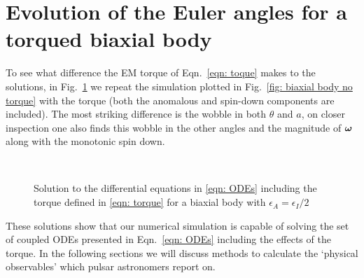 \documentclass[../full_thesis/full_thesis.tex]{subfiles}
\begin{document}
\section{Evolution of the Euler angles for a torqued biaxial body}
To see what difference the EM torque of Eqn.~\eqref{eqn: toque}  makes to the
solutions, in Fig.~\ref{fig: biaxial body with torque} we repeat the simulation
plotted in Fig.~\ref{fig: biaxial body no torque} with the torque (both the
anomalous and spin-down components are included). The most
striking difference is the wobble in both $\theta$ and $a$, on closer
inspection one also finds this wobble in the other angles and the magnitude of
$\boldsymbol{\omega}$ along with the monotonic spin down.
\begin{figure}[ht]
    \centering
{} \\
\caption{Solution to the differential equations in \eqref{eqn: ODEs} including the torque defined in \eqref{eqn: torque} for a biaxial body with $\epsilon_{A}=\epsilon_{I}/2$ }
\label{fig: biaxial body with torque}
\end{figure}

These solutions show that our numerical simulation is capable of solving the
set of coupled ODEs presented in Eqn.~\eqref{eqn: ODEs} including the effects
of the torque. In the following sections we will discuss methods to calculate
the `physical observables' which pulsar astronomers report on.
\end{document}
